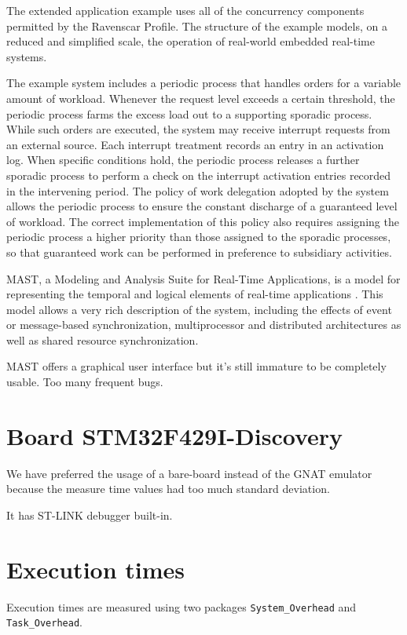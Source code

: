 \documentclass{article}
\begin{document}
The extended application example uses all of the concurrency components permitted by the Ravenscar Profile. The structure of the example models, on a reduced and simplified scale, the operation of real-world embedded real-time systems.

The example system includes a periodic process that handles orders for a variable amount of workload. Whenever the request level exceeds a certain threshold, the periodic process farms the excess load out to a supporting sporadic process. While such orders are executed, the system may receive interrupt requests from an external source. Each interrupt treatment records an entry in an activation log. When specific conditions hold, the periodic process releases a further sporadic process to perform a check on the interrupt activation entries recorded in the intervening period. The policy of work delegation adopted by the system allows the periodic process to ensure the constant discharge of a guaranteed level of workload. The correct implementation of this policy also requires assigning the periodic process a higher priority than those assigned to the sporadic processes, so that guaranteed work can be performed in preference to subsidiary activities.

MAST, a Modeling and Analysis Suite for Real-Time Applications, is a model for representing the temporal and logical elements of real-time applications \cite{mast}. This model allows a very rich description of the system, including the effects of event or message-based synchronization, multiprocessor and distributed architectures as well as shared resource synchronization.

MAST offers a graphical user interface but it's still immature to be completely usable. Too many frequent bugs.

\section{Board STM32F429I-Discovery}

We have preferred the usage of a bare-board instead of the GNAT emulator because the measure time values had too much standard deviation.

It has ST-LINK debugger built-in.

\section{Execution times}

Execution times are measured using two packages \texttt{System\_Overhead} and \texttt{Task\_Overhead}.
\end{document}
